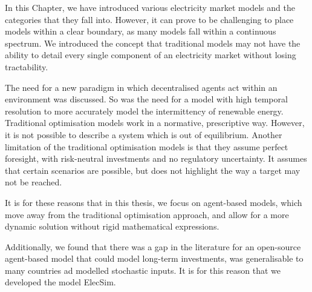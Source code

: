 In this Chapter, we have introduced various electricity market models and the categories that they fall into. However, it can prove to be challenging to place models within a clear boundary, as many models fall within a continuous spectrum. We introduced the concept that traditional models may not have the ability to detail every single component of an electricity market without losing tractability.

The need for a new paradigm in which decentralised agents act within an environment was discussed. So was the need for a model with high temporal resolution to more accurately model the intermittency of renewable energy. Traditional optimisation models work in a normative, prescriptive way. However, it is not possible to describe a system which is out of equilibrium. Another limitation of the traditional optimisation models is that they assume perfect foresight, with risk-neutral investments and no regulatory uncertainty. It assumes that certain scenarios are possible, but does not highlight the way a target may not be reached.

It is for these reasons that in this thesis, we focus on agent-based models, which move away from the traditional optimisation approach, and allow for a more dynamic solution without rigid mathematical expressions.

Additionally, we found that there was a gap in the literature for an open-source agent-based model that could model long-term investments, was generalisable to many countries ad modelled stochastic inputs. It is for this reason that we developed the model ElecSim.





